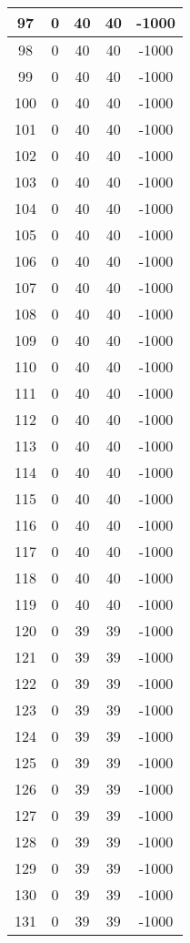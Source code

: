 \documentclass[letterpaper, 12pt]{article}
\begin{document}
\begin{longtable}{|c|c|c|c|c|}
\hline
97 & 0 & 40 & 40 & -1000 \\
\hline
98 & 0 & 40 & 40 & -1000 \\
\hline
99 & 0 & 40 & 40 & -1000 \\
\hline
100 & 0 & 40 & 40 & -1000 \\
\hline
101 & 0 & 40 & 40 & -1000 \\
\hline
102 & 0 & 40 & 40 & -1000 \\
\hline
103 & 0 & 40 & 40 & -1000 \\
\hline
104 & 0 & 40 & 40 & -1000 \\
\hline
105 & 0 & 40 & 40 & -1000 \\
\hline
106 & 0 & 40 & 40 & -1000 \\
\hline
107 & 0 & 40 & 40 & -1000 \\
\hline
108 & 0 & 40 & 40 & -1000 \\
\hline
109 & 0 & 40 & 40 & -1000 \\
\hline
110 & 0 & 40 & 40 & -1000 \\
\hline
111 & 0 & 40 & 40 & -1000 \\
\hline
112 & 0 & 40 & 40 & -1000 \\
\hline
113 & 0 & 40 & 40 & -1000 \\
\hline
114 & 0 & 40 & 40 & -1000 \\
\hline
115 & 0 & 40 & 40 & -1000 \\
\hline
116 & 0 & 40 & 40 & -1000 \\
\hline
117 & 0 & 40 & 40 & -1000 \\
\hline
118 & 0 & 40 & 40 & -1000 \\
\hline
119 & 0 & 40 & 40 & -1000 \\
\hline
120 & 0 & 39 & 39 & -1000 \\
\hline
121 & 0 & 39 & 39 & -1000 \\
\hline
122 & 0 & 39 & 39 & -1000 \\
\hline
123 & 0 & 39 & 39 & -1000 \\
\hline
124 & 0 & 39 & 39 & -1000 \\
\hline
125 & 0 & 39 & 39 & -1000 \\
\hline
126 & 0 & 39 & 39 & -1000 \\
\hline
127 & 0 & 39 & 39 & -1000 \\
\hline
128 & 0 & 39 & 39 & -1000 \\
\hline
129 & 0 & 39 & 39 & -1000 \\
\hline
130 & 0 & 39 & 39 & -1000 \\
\hline
131 & 0 & 39 & 39 & -1000 \\

\end{longtable}
\end{document}
